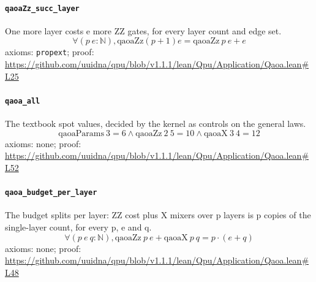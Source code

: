 \documentclass[11pt]{article}
\begin{document}
\paragraph{\texttt{qaoaZz\_succ\_layer}}
One more layer costs e more ZZ gates, for every layer count and edge set.
\[ \forall (p\ e : \mathbb{N}), \mathrm{qaoaZz} (p + 1) e = \mathrm{qaoaZz}\ p\ e + e \]
\noindent axioms: \texttt{propext}; proof: \url{https://github.com/uuidna/qpu/blob/v1.1.1/lean/Qpu/Application/Qaoa.lean\#L25}

\paragraph{\texttt{qaoa\_all}}
The textbook spot values, decided by the kernel as controls on the general laws.
\[ \mathrm{qaoaParams}\ 3 = 6 \land \mathrm{qaoaZz}\ 2\ 5 = 10 \land \mathrm{qaoaX}\ 3\ 4 = 12 \]
\noindent axioms: none; proof: \url{https://github.com/uuidna/qpu/blob/v1.1.1/lean/Qpu/Application/Qaoa.lean\#L52}

\paragraph{\texttt{qaoa\_budget\_per\_layer}}
The budget splits per layer: ZZ cost plus X mixers over p layers is p copies of the single-layer count, for every p, e and q.
\[ \forall (p\ e\ q : \mathbb{N}), \mathrm{qaoaZz}\ p\ e + \mathrm{qaoaX}\ p\ q = p \cdot (e + q) \]
\noindent axioms: none; proof: \url{https://github.com/uuidna/qpu/blob/v1.1.1/lean/Qpu/Application/Qaoa.lean\#L48}
\end{document}
